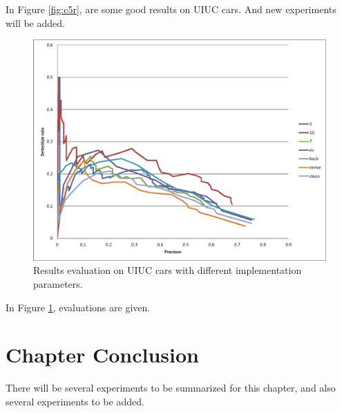 In Figure \ref{fig:c5r}, are some good results on UIUC cars. And new experiments will be added.
\begin{figure}
\centering

\includegraphics[width=1\textwidth,bb=0 0 480 425]{pms.eps}


\caption[Result evaluation]{Results evaluation on UIUC cars with different implementation parameters.}
\label{fig:c52}
\end{figure}

In Figure \ref{fig:c52}, evaluations are given.

\section{Chapter Conclusion}
\label{conc5}

There will be several experiments to be summarized for this chapter, and also several experiments to be added.
